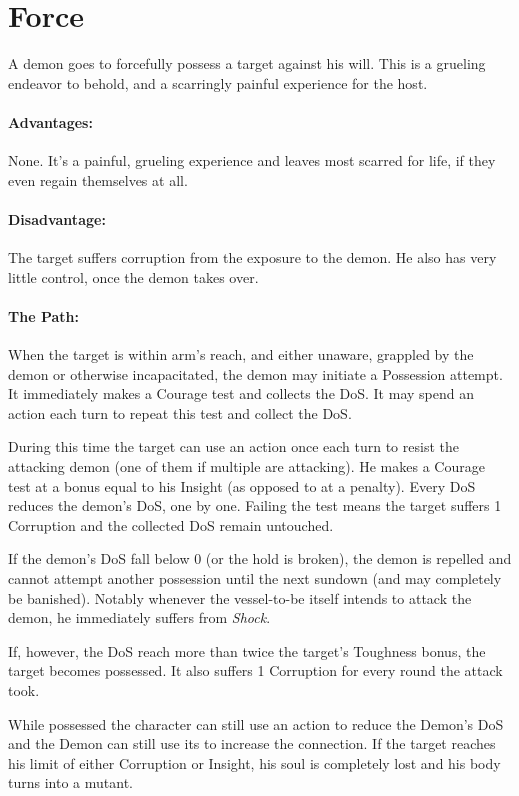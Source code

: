 \section{Force}
\label{possession:force}
A demon goes to forcefully possess a target against his will.
This is a grueling endeavor to behold,
and a scarringly painful experience for the host.
\paragraph{Advantages:}
None.
It's a painful, grueling experience and leaves most scarred for life, if they even regain themselves at all.
\paragraph{Disadvantage:}
The target suffers corruption from the exposure to the demon.
He also has very little control, once the demon takes over.
\paragraph{The Path:}
When the target is within arm's reach, and either unaware, grappled by the demon or otherwise incapacitated, the demon may initiate a Possession attempt.
It immediately makes a Courage test and collects the DoS.
It may spend an action each turn to repeat this test and collect the DoS.
\par \vspace{-5mm}
During this time the target can use an action once each turn to resist the attacking demon
	(one of them if multiple are attacking).
He makes a Courage test at a bonus equal to his Insight (as opposed to at a penalty).
Every DoS reduces the demon's DoS, one by one.
Failing the test means the target suffers 1 Corruption and the collected DoS remain untouched.
\par \vspace{-5mm}
If the demon's DoS fall below 0 (or the hold is broken), the demon is repelled and cannot attempt another possession until the next sundown (and may completely be banished).
Notably whenever the vessel-to-be itself intends to attack the demon, he immediately suffers from \emph{Shock}.
\par \vspace{-5mm}
If, however, the DoS reach more than twice the target's Toughness bonus, the target becomes possessed.
It also suffers 1 Corruption for every round the attack took.
\par \vspace{-5mm}
While possessed the character can still use an action to reduce the Demon's DoS and the Demon can still use its to increase the connection.
If the target reaches his limit of either Corruption or Insight, his soul is completely lost and his body turns into a mutant.
